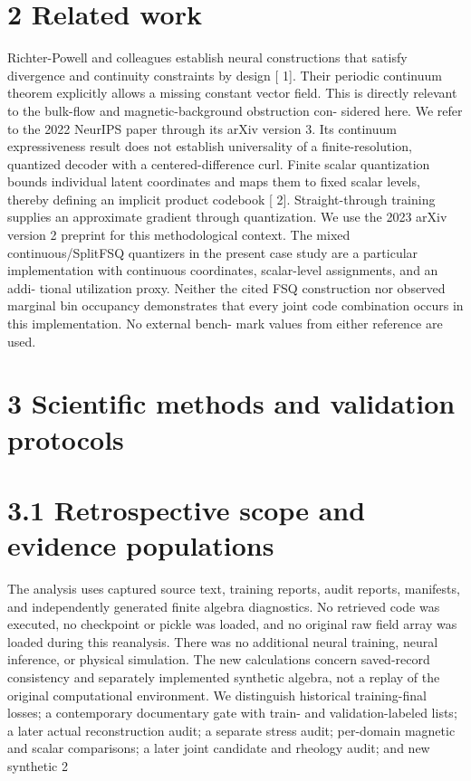 \documentclass[11pt]{article}
\begin{document}
\section*{2 Related work}

Richter-Powell and colleagues establish neural constructions that satisfy divergence and continuity
constraints by design [ 1]. Their periodic continuum theorem explicitly allows a missing constant
vector field. This is directly relevant to the bulk-flow and magnetic-background obstruction con-
sidered here. We refer to the 2022 NeurIPS paper through its arXiv version 3. Its continuum
expressiveness result does not establish universality of a finite-resolution, quantized decoder with
a centered-difference curl.
Finite scalar quantization bounds individual latent coordinates and maps them to fixed scalar
levels, thereby defining an implicit product codebook [ 2]. Straight-through training supplies an
approximate gradient through quantization. We use the 2023 arXiv version 2 preprint for this
methodological context. The mixed continuous/SplitFSQ quantizers in the present case study are
a particular implementation with continuous coordinates, scalar-level assignments, and an addi-
tional utilization proxy. Neither the cited FSQ construction nor observed marginal bin occupancy
demonstrates that every joint code combination occurs in this implementation. No external bench-
mark values from either reference are used.

\section*{3 Scientific methods and validation protocols}


\section*{3.1 Retrospective scope and evidence populations}

The analysis uses captured source text, training reports, audit reports, manifests, and independently
generated finite algebra diagnostics. No retrieved code was executed, no checkpoint or pickle
was loaded, and no original raw field array was loaded during this reanalysis. There was no
additional neural training, neural inference, or physical simulation. The new calculations concern
saved-record consistency and separately implemented synthetic algebra, not a replay of the original
computational environment.
We distinguish historical training-final losses; a contemporary documentary gate with train- and
validation-labeled lists; a later actual reconstruction audit; a separate stress audit; per-domain
magnetic and scalar comparisons; a later joint candidate and rheology audit; and new synthetic
2
\end{document}
